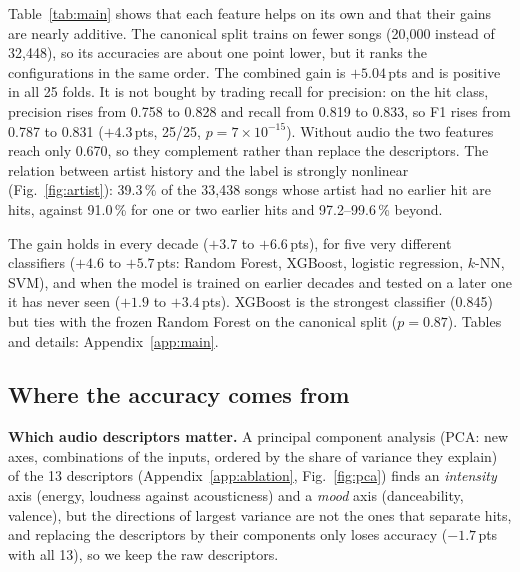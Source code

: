 \documentclass[conference]{IEEEtran}
\newcommand{\pp}{\,pts}
\begin{document}
Table~\ref{tab:main} shows that each feature helps on its own and that their gains are
nearly additive. The canonical split trains on fewer songs (20{,}000 instead of 32{,}448), so its
accuracies are about one point lower, but it ranks the configurations in the same order. The combined gain is $+5.04$\pp{} and is positive in all 25 folds.
It is not bought by trading recall for precision: on the hit class, precision rises from
0.758 to 0.828 and recall from 0.819 to 0.833, so F1 rises from 0.787 to 0.831 ($+4.3$\pp,
25/25, $p=7\times10^{-15}$).
Without audio the two features reach only 0.670, so they complement rather than replace
the descriptors. The relation between artist history and the label is strongly nonlinear
(Fig.~\ref{fig:artist}):
39.3\,\% of the 33{,}438 songs whose artist had no earlier hit are hits, against 91.0\,\%
for one or two earlier hits and 97.2--99.6\,\% beyond.

The gain holds in every decade ($+3.7$ to $+6.6$\pp), for five very different classifiers ($+4.6$ to
$+5.7$\pp: Random Forest, XGBoost, logistic regression, $k$-NN, SVM), and when the model is trained on earlier
decades and tested on a later one it has never seen ($+1.9$ to $+3.4$\pp). XGBoost is the strongest classifier
(0.845) but ties with the frozen Random Forest on the canonical split ($p=0.87$). Tables and details:
Appendix~\ref{app:main}.


\subsection{Where the accuracy comes from}\label{sec:ablation}

\textbf{Which audio descriptors matter.} A principal component analysis (PCA: new axes, combinations of the
inputs, ordered by the share of variance they explain) of the 13 descriptors
(Appendix~\ref{app:ablation}, Fig.~\ref{fig:pca}) finds an \emph{intensity} axis (energy, loudness against
acousticness) and a \emph{mood} axis (danceability, valence), but the directions of largest variance are not the
ones that separate hits, and replacing the descriptors by their components only loses accuracy ($-1.7$\pp{} with all
13), so we keep the raw descriptors.
\end{document}
